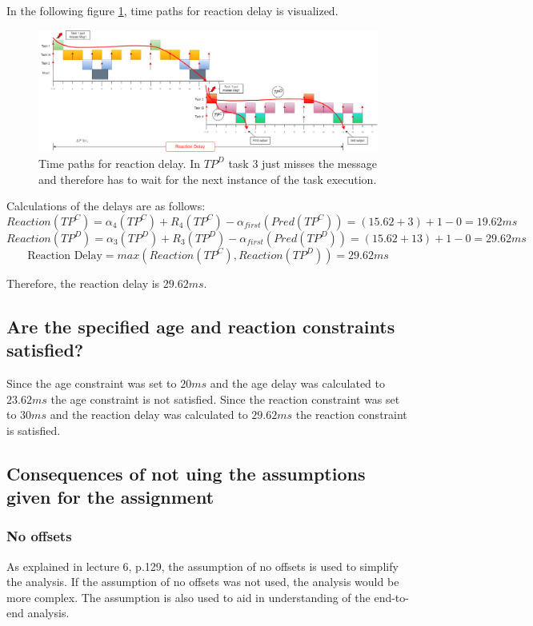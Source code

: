             In the following figure \ref{fig:reactiondelaypaths}, time paths for reaction delay is visualized.

            \begin{figure}[H]
                \centering
                \includegraphics[width=1\textwidth]{images/TimedPathReactionDelay.png}
                \caption{Time paths for reaction delay. In $TP^D$ task 3 just misses the message and therefore has to wait for the next instance of the task execution.}
                \label{fig:reactiondelaypaths} 
            \end{figure}

            Calculations of the delays are as follows: 
            $$Reaction(TP^C) = \alpha_4(TP^C) + R_4(TP^C) - \alpha_{first}(Pred(TP^C)) = (15.62+3) + 1 - 0 = 19.62ms$$
            $$Reaction(TP^D) = \alpha_3(TP^D) + R_3(TP^D) - \alpha_{first}(Pred(TP^D)) = (15.62+13) + 1 - 0 = 29.62ms$$
            $$\text{Reaction Delay} = max(Reaction(TP^C), Reaction(TP^D)) = 29.62ms$$

            Therefore, the reaction delay is $29.62ms$.

        \subsection*{\textbf{Are the specified age and reaction constraints satisfied?}}
            Since the age constraint was set to $20ms$ and the age delay was calculated to $23.62ms$ the age constraint is not satisfied. Since the reaction constraint was set to $30ms$ and the reaction delay was calculated to $29.62ms$ the reaction constraint is satisfied.

        \subsection*{\textbf{Consequences of not uing the assumptions given for the assignment}}
            \subsubsection*{No offsets}
                As explained in lecture 6, p.129, the assumption of no offsets is used to simplify the analysis. If the assumption of no offsets was not used, the analysis would be more complex. The assumption is also used to aid in understanding of the end-to-end analysis.

